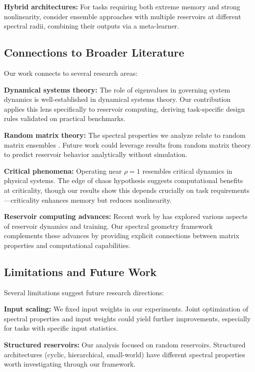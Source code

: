 \documentclass{article}
\begin{document}
\textbf{Hybrid architectures:} For tasks requiring both extreme memory and strong nonlinearity, consider ensemble approaches with multiple reservoirs at different spectral radii, combining their outputs via a meta-learner.

\subsection{Connections to Broader Literature}

Our work connects to several research areas:

\textbf{Dynamical systems theory:} The role of eigenvalues in governing system dynamics is well-established in dynamical systems theory. Our contribution applies this lens specifically to reservoir computing, deriving task-specific design rules validated on practical benchmarks.

\textbf{Random matrix theory:} The spectral properties we analyze relate to random matrix ensembles \citep{tao2012}. Future work could leverage results from random matrix theory to predict reservoir behavior analytically without simulation.

\textbf{Critical phenomena:} Operating near $\rho = 1$ resembles critical dynamics in physical systems. The edge of chaos hypothesis \citep{bertschinger2004} suggests computational benefits at criticality, though our results show this depends crucially on task requirements—criticality enhances memory but reduces nonlinearity.

\textbf{Reservoir computing advances:} Recent work by \citet{hart2021thesis,hart2022,hart2025} has explored various aspects of reservoir dynamics and training. Our spectral geometry framework complements these advances by providing explicit connections between matrix properties and computational capabilities.

\subsection{Limitations and Future Work}

Several limitations suggest future research directions:

\textbf{Input scaling:} We fixed input weights in our experiments. Joint optimization of spectral properties and input weights could yield further improvements, especially for tasks with specific input statistics.

\textbf{Structured reservoirs:} Our analysis focused on random reservoirs. Structured architectures (cyclic, hierarchical, small-world) have different spectral properties worth investigating through our framework.
\end{document}

